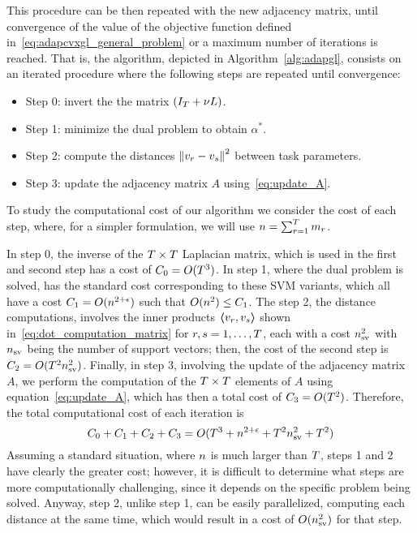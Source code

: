 This procedure can be then repeated with the new adjacency matrix, until convergence of the value of the objective function defined in~\eqref{eq:adapcvxgl_general_problem} or a maximum number of iterations is reached. That is, the algorithm, depicted in Algorithm~\ref{alg:adapgl}, consists on an iterated procedure where the following steps are repeated until convergence:
\begin{itemize}
    \item Step 0: invert the the matrix $(I_T + \nu L)$.
    \item Step 1: minimize the dual problem to obtain $\alpha^*$.
    \item Step 2: compute the distances $\left\lVert v_r - v_s\right\rVert^2$ between task parameters.
    \item Step 3: update the adjacency matrix $A$ using~\eqref{eq:update_A}.
\end{itemize}


To study the computational cost of our algorithm we consider the cost of each step, where, for a simpler formulation, we will use $n = \sum_{r=1}^T m_r$.

In step 0, the inverse of the $T \times T$ Laplacian matrix, which is used in the first and second step has a cost of $C_0 = O(T^3)$.
%
In step 1, where the dual problem is solved, has the standard cost corresponding to these SVM variants, which all have a cost $C_1 = O(n^{2+\epsilon})$ such that $O(n^2) \leq C_1$.
%
The step 2, the distance computations, involves the inner products $\bm{\left\langle} v_r, v_s \bm{\right\rangle}$ shown in~\eqref{eq:dot_computation_matrix} for $r,s=1, \ldots, T$, each with a cost $n_{\text{sv}}^2$ with $n_{\text{sv}}$ being the number of support vectors; then, the cost of the second step is $C_2 = O(T^2 n_\text{sv}^2)$.
%
Finally, in step 3, involving the update of the adjacency matrix $A$, we perform the computation of the $T \times T$ elements of $A$ using equation~\eqref{eq:update_A}, which has then a total cost of $C_3 = O(T^2)$.
%
Therefore, the total computational cost of each iteration is
$$ C_0 + C_1 + C_2 + C_3 = O(T^3 + n^{2+\epsilon} + T^2 n_\text{sv}^2 + T^2)$$
%
Assuming a standard situation, where $n$ is much larger than $T$, steps 1 and 2 have clearly the greater cost; however, it is difficult to determine what steps are more computationally challenging, since it depends on the specific problem being solved. Anyway, step 2, unlike step 1, can be easily parallelized, computing each distance at the same time, which would result in a cost of $O(n_\text{sv}^2)$ for that step.

